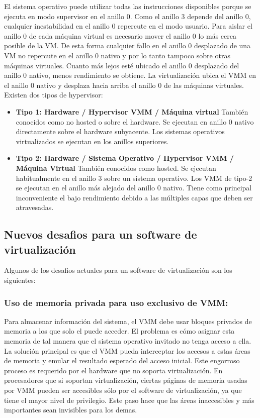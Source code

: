 \documentclass[10pt,a4paper,spanish]{report}
\begin{document}
  \noindent
  El sistema operativo puede utilizar todas las instrucciones disponibles porque se ejecuta en modo supervisor en el anillo 0. Como el anillo 3 depende del anillo 0, cualquier inestabilidad en el anillo 0 repercute en el modo usuario. Para aislar el anillo 0 de cada máquina virtual es necesario mover el anillo 0 lo más cerca posible de la VM. De esta forma cualquier fallo en el anillo 0 desplazado de una VM no repercute en el anillo 0 nativo y por lo tanto tampoco sobre otras máquinas virtuales. Cuanto más lejos esté ubicado el anillo 0 desplazado del anillo 0 nativo, menos rendimiento se obtiene. La virtualización ubica el VMM en el anillo 0 nativo y desplaza hacia arriba el anillo 0 de las máquinas virtuales.\\

  \noindent
  Existen dos tipos de hypervisor:
  \begin{itemize}
    \item \textbf{Tipo 1: Hardware / Hypervisor VMM / Máquina virtual}
    También conocidos como no hosted o sobre el hardware. Se ejecutan en anillo 0 nativo directamente sobre el hardware subyacente. Los sistemas operativos virtualizados se ejecutan en los anillos superiores.
    \item  \textbf{Tipo 2: Hardware / Sistema Operativo / Hypervisor VMM / Máquina Virtual}
    También conocidos como hosted. Se ejecutan habitualmente en el anillo 3 sobre un sistema operativo. Los VMM de tipo-2 se ejecutan en el anillo más alejado del anillo 0 nativo. Tiene como principal inconveniente el bajo rendimiento debido a las múltiples capas que deben ser atravesadas.
  \end{itemize}

  \newpage
  \subsection{Nuevos desafios para un software de virtualización}

  \noindent
  Algunos de los desafios actuales para un software de virtualización son los siguientes:

  \subsubsection{Uso de memoria privada para uso exclusivo de VMM:}

  \noindent
  Para almacenar información del sistema, el VMM debe usar bloques privados de memoria a los que solo el puede acceder. El problema es cómo asignar esta memoria de tal manera que el sistema operativo invitado no tenga acceso a ella. La solución principal es que el VMM pueda interceptar los accesos a estas áreas de memoria y emular el resultado esperado del acceso inicial. Este engorroso proceso es requerido por el hardware que no soporta virtualización. En procesadores que si soportan virtualización, ciertas páginas de memoria usadas por VMM pueden ser accesibles sólo por el software de virtualización, ya que tiene el mayor nivel de privilegio. Este paso hace que las áreas inaccesibles y más importantes sean invisibles para los demas.
\end{document}

